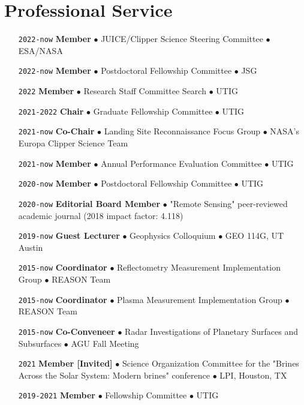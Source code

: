 \section*{Professional Service}

\begin{itemize}[leftmargin=5.8em, labelsep=1.5em]
    \setlength\itemsep{-.5em}
    \item[\texttt{2022-now}] \textbf{Member} $\bullet$ JUICE/Clipper Science Steering Committee $\bullet$ ESA/NASA
    \item[\texttt{2022-now}] \textbf{Member} $\bullet$ Postdoctoral Fellowship Committee $\bullet$ JSG
    \item[\texttt{2022}] \textbf{Member} $\bullet$ Research Staff Committee Search $\bullet$ UTIG
    \item[\texttt{2021-2022}] \textbf{Chair} $\bullet$ Graduate Fellowship Committee $\bullet$ UTIG
    \item[\texttt{2021-now}] \textbf{Co-Chair} $\bullet$ Landing Site Reconnaissance Focus Group  $\bullet$ NASA's Europa Clipper Science Team
    \item[\texttt{2021-now}] \textbf{Member} $\bullet$ Annual Performance Evaluation Committee $\bullet$ UTIG
    \item[\texttt{2020-now}] \textbf{Member} $\bullet$ Postdoctoral Fellowship Committee $\bullet$ UTIG
    \item[\texttt{2020-now}] \textbf{Editorial Board Member} $\bullet$ "Remote Sensing" peer-reviewed academic journal (2018 impact factor: 4.118)
    \item[\texttt{2019-now}] \textbf{Guest Lecturer} $\bullet$ Geophysics Colloquium $\bullet$  GEO 114G, UT Austin
    \item[\texttt{2015-now}] \textbf{Coordinator} $\bullet$ Reflectometry Measurement Implementation Group $\bullet$ REASON Team
    \item[\texttt{2015-now}] \textbf{Coordinator} $\bullet$ Plasma Measurement Implementation Group $\bullet$ REASON Team
    \item[\texttt{2015-now}] \textbf{Co-Conveneer} $\bullet$  Radar Investigations of Planetary Surfaces and Subsurfaces $\bullet$ AGU Fall Meeting
    \item[\texttt{2021}] \textbf{Member [Invited]} $\bullet$ Science Organization Committee for the "Brines Across the Solar System: Modern brines" conference $\bullet$ LPI, Houston, TX
    \item[\texttt{2019-2021}] \textbf{Member} $\bullet$ Fellowship Committee $\bullet$ UTIG

\end{itemize}
